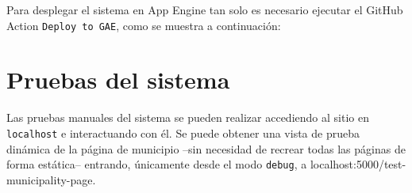 Para desplegar el sistema en App Engine tan solo es necesario ejecutar el GitHub Action \texttt{Deploy to GAE}, como se muestra a continuación:


\section{Pruebas del sistema}

Las pruebas manuales del sistema se pueden realizar accediendo al sitio en \texttt{localhost} e interactuando con él. Se puede obtener una vista de prueba dinámica de la página de municipio –sin necesidad de recrear todas las páginas de forma estática– entrando, únicamente desde el modo \texttt{debug}, a localhost:5000/test-municipality-page.
